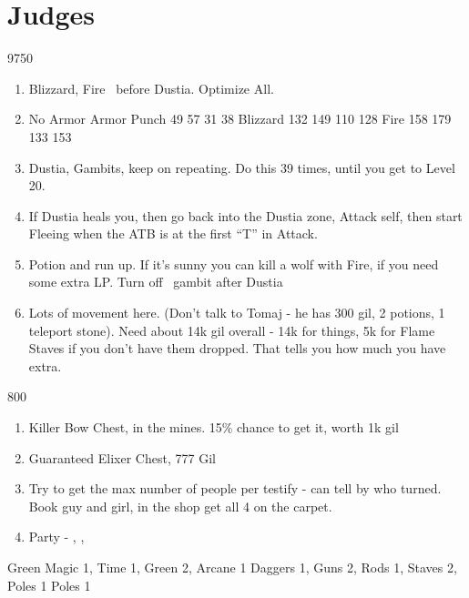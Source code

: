 \chapter{Judges}

\begin{shop}{9750}
\end{shop}
\begin{enumerate}
\item Blizzard, Fire \vaan\ before Dustia. Optimize All.
\item 	No Armor		Armor	
Punch	49	57	31	38
Blizzard	132	149	110	128
Fire	158	179	133	153
\item Dustia, Gambits, keep on repeating. Do this 39 times, until you get to Level 20.
\item If Dustia heals you, then go back into the Dustia zone, Attack self, then start Fleeing when the ATB is at the first ``T'' in Attack.
\item Potion and run up. If it's sunny you can kill a wolf with Fire, if you need some extra LP. Turn off \vaan\ gambit after Dustia
\item Lots of movement here. (Don't talk to Tomaj - he has 300 gil, 2 potions, 1 teleport stone). Need about 14k gil overall - 14k for things, 5k for Flame Staves if you don't have them dropped. That tells you how much you have extra.
\end{enumerate}
\begin{shop}{800}
\end{shop}
\begin{enumerate}
\item Killer Bow Chest, in the mines. 15\% chance to get it, worth 1k gil
\item Guaranteed Elixer Chest, 777 Gil
\item Try to get the max number of people per testify - can tell by who turned. Book guy and girl, in the shop get all 4 on the carpet.
\item Party - \vaan, \balthier, \basch
\end{enumerate}
\begin{liscense}
\begin{itemize}
\vaanf Green Magic 1, Time 1, Green 2, Arcane 1
\balthierf Daggers 1, Guns 2, Rods 1, Staves 2, Poles 1
\baschf Poles 1
\end{itemize}
\end{liscense}
